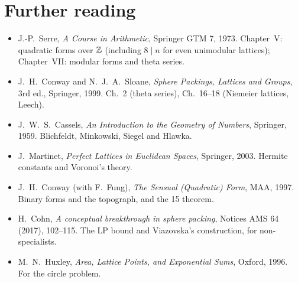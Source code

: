 \section*{Further reading}
\begin{itemize}[nosep]
\item J.-P.~Serre, \emph{A Course in Arithmetic}, Springer GTM 7, 1973. Chapter~V: quadratic forms over $\mathbb{Z}$
  (including $8\mid n$ for even unimodular lattices); Chapter~VII: modular forms and theta series.
\item J.~H.~Conway and N.~J.~A.~Sloane, \emph{Sphere Packings, Lattices and Groups}, 3rd ed., Springer, 1999.
  Ch.~2 (theta series), Ch.~16--18 (Niemeier lattices, Leech).
\item J.~W.~S.~Cassels, \emph{An Introduction to the Geometry of Numbers}, Springer, 1959. Blichfeldt,
  Minkowski, Siegel and Hlawka.
\item J.~Martinet, \emph{Perfect Lattices in Euclidean Spaces}, Springer, 2003. Hermite constants and Voronoi's theory.
\item J.~H.~Conway (with F.~Fung), \emph{The Sensual (Quadratic) Form}, MAA, 1997. Binary forms
  and the topograph, and the 15 theorem.
\item H.~Cohn, \emph{A conceptual breakthrough in sphere packing}, Notices AMS 64 (2017), 102--115. The LP
  bound and Viazovska's construction, for non-specialists.
\item M.~N.~Huxley, \emph{Area, Lattice Points, and Exponential Sums}, Oxford, 1996. For the circle problem.
\end{itemize}
